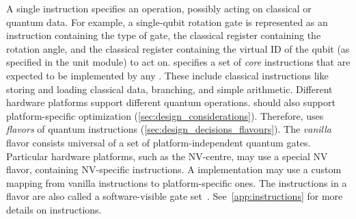 A single instruction specifies an operation, possibly acting on classical or quantum data.
For example, a single-qubit rotation gate is represented as an instruction containing the type of gate, the classical register containing the rotation angle, and the classical register containing the virtual ID of the qubit (as specified in the unit module) to act on.
\netqasm specifies a set of \textit{core} instructions that are expected to be implemented by any \QNPU.
These include classical instructions like storing and loading classical data, branching, and simple arithmetic.
Different hardware platforms support different quantum operations.
\netqasm should also support platform-specific optimization (\cref{sec:design_considerations}).
Therefore, \netqasm uses \textit{flavors} of quantum instructions (\cref{sec:design_decisions_flavours}).
The \textit{vanilla} flavor consists universal of a set of platform-independent quantum gates.
Particular hardware platforms, such as the NV-centre, may use a special NV flavor, containing NV-specific instructions.
A \QNPU implementation may use a custom mapping from vanilla instructions to platform-specific ones.
The instructions in a flavor are also called a software-visible gate set~\cite{murali2019fullstack}.
See~\cref{app:instructions} for more details on \netqasm instructions.

